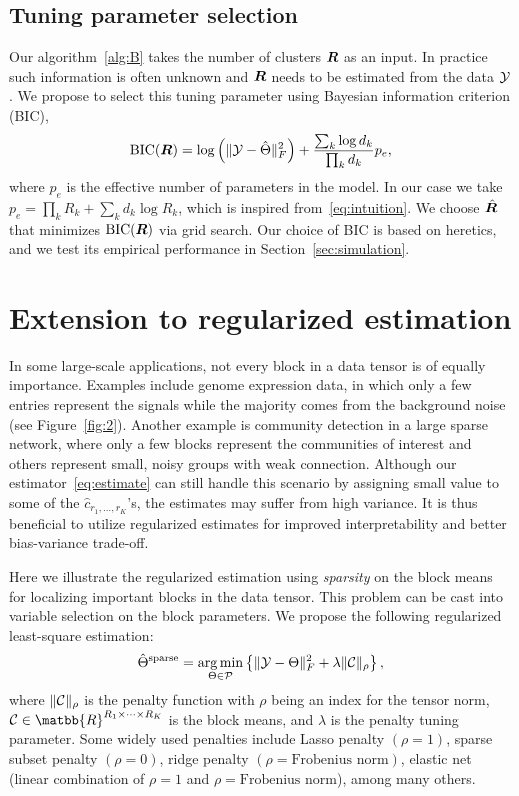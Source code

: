 \documentclass{article}
\begin{document}
\subsection{Tuning parameter selection}\label{sec:tuning}
Our algorithm~\ref{alg:B} takes the number of clusters $\bm{R}$ as an input. In practice such information is often unknown and $\bm{R}$ needs to be estimated from the data $\mathcal{Y}$. We propose to select this tuning parameter using Bayesian information criterion (BIC), 
\begin{equation}\label{eq:BIC}
\text{BIC}(\bm{R}) =  \log\left(\lVert\mathcal{Y}-\hat \Theta\rVert_F^2\right)+{ \sum_k \log d_k \over \prod_k d_k}p_e,
\end{equation}
where $p_e$ is the effective number of parameters in the model. In our case we take $p_e=\prod_k R_k+\sum_k d_k\log R_k$, which is inspired from~\eqref{eq:intuition}. We choose $\hat {\bm{R}}$ that minimizes $\text{BIC}(\bm{R})$ via grid search. Our choice of BIC is based on heretics, and we test its empirical performance in Section~\ref{sec:simulation}.  

\section{Extension to regularized estimation}
In some large-scale applications, not every block in a data tensor is of equally importance. Examples include genome expression data, in which only a few entries represent the signals while the majority comes from the background noise (see Figure~\ref{fig:2}). Another example is community detection in a large sparse network, where only a few blocks represent the communities of interest and others represent small, noisy groups with weak connection.  Although our estimator~\eqref{eq:estimate} can still handle this scenario by assigning small value to some of the $\hat c_{r_1,\ldots,r_K}$'s, the estimates may suffer from high variance. It is thus beneficial to utilize regularized estimates for improved interpretability and better bias-variance trade-off. 

Here we illustrate the regularized estimation using \emph{sparsity} on the block means for localizing important blocks in the data tensor. This problem can be cast into variable selection on the block parameters. We propose the following regularized least-square estimation:
\[
\hat \Theta^{\text{sparse}}=\operatorname*{arg\,min}_{\Theta\in \mathcal{P}}\left\{\lVert\mathcal{Y}-\Theta\rVert_F^2+\lambda \lVert\mathcal{C}\rVert_\rho
\right\},
\]
where $\lVert\mathcal{C}\rVert_\rho$ is the penalty function with $\rho$ being an index for the tensor norm, $\tC\in\matbb{R}^{R_1\times \cdots\times R_K}$ is the block means, and $\lambda$ is the penalty tuning parameter. Some widely used penalties include Lasso penalty $(\rho=1)$, sparse subset penalty $(\rho=0)$, ridge penalty $(\rho=\text{Frobenius norm})$, elastic net (linear combination of $\rho=1$ and $\rho=\text{Frobenius norm}$), among many others. 
\end{document}
